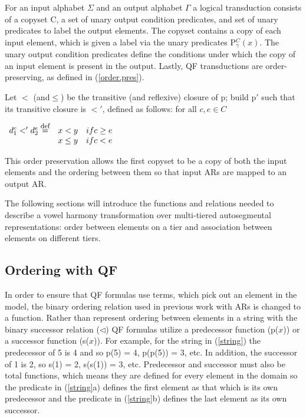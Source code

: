 \documentclass[,doc,floatsintext]{apa6}
\def\defeq{\mathrel{\buildrel \mbox{\footnotesize def} \over =}}
\theoremstyle{definition}
\theoremstyle{definition}
\theoremstyle{definition}
\theoremstyle{remark}
\begin{document}
\noindent For an input alphabet \(\Sigma\) and an output alphabet
\(\Gamma\) a logical transduction consists of a copyset C, a set of
unary output condition predicates, and set of unary predicates to label
the output elements. The copyset contains a copy of each input element,
which is given a label via the unary predicates P\(^C_{\gamma}(x)\). The
unary output condition predicates define the conditions under which the
copy of an input element is present in the output. Lastly, QF
transductions are order-preserving, as defined in (\ref{order.pres}).

\begin{exe}
\ex\label{order.pres} Let $<$ (and$\leq$) be the transitive (and reflexive) closure of p; build p$'$ such that its transitive closure is $<'$, defined as follows: for all $c, e\in C$
\end{exe}

\hspace{1.85in}
\(\begin{array}{ccc} d^c_1 <' d^e_2 \defeq & x<y & if c\geq e \\  & x\leq y & if c<e \end{array}\)
\vspace{0.2in}

\noindent This order preservation allows the first copyset to be a copy
of both the input elements and the ordering between them so that input
ARs are mapped to an output AR.

The following sections will introduce the functions and relations needed
to describe a vowel harmony transformation over multi-tiered
autosegmental representations: order between elements on a tier and
association between elements on different tiers.

\subsection{Ordering with QF}\label{ordering-with-qf}

In order to ensure that QF formulas use terms, which pick out an element
in the model, the binary ordering relation used in previous work with
ARs is changed to a function. Rather than represent ordering between
elements in a string with the binary successor relation (\(\lhd\)) QF
formulas utilize a predecessor function (p(\(x\))) or a successor
function (s(\(x\))). For example, for the string in (\ref{string}) the
predecessor of 5 is 4 and so p(5) = 4, p(p(5)) = 3, etc. In addition,
the successor of 1 is 2, so s(1) = 2, s(s(1)) = 3, etc. Predecessor and
successor must also be total functions, which means they are defined for
every element in the domain so the predicate in (\ref{string}a) defines
the first element as that which is its own predecessor and the predicate
in (\ref{string}b) defines the last element as its own successor.
\end{document}
